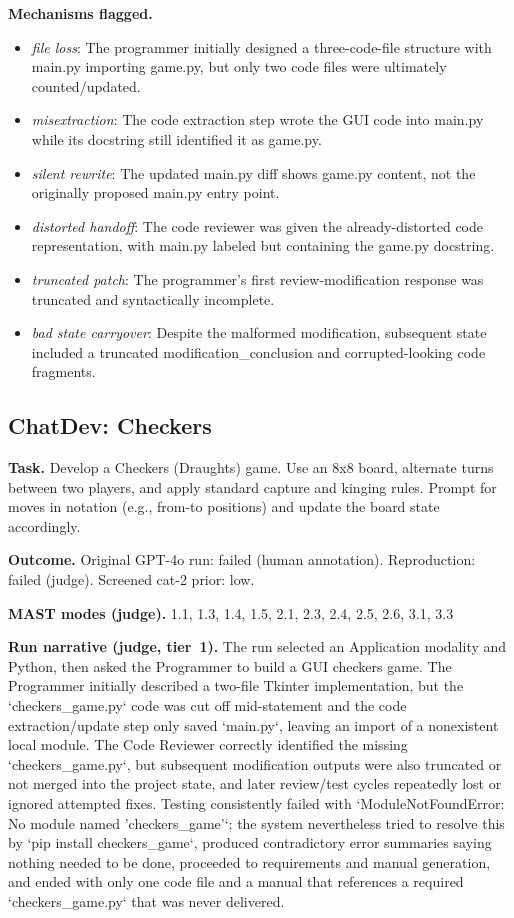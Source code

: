 \textbf{Mechanisms flagged.}
\begin{itemize}
  \item \emph{file loss}: The programmer initially designed a three-code-file structure with main.py importing game.py, but only two code files were ultimately counted/updated.
  \item \emph{misextraction}: The code extraction step wrote the GUI code into main.py while its docstring still identified it as game.py.
  \item \emph{silent rewrite}: The updated main.py diff shows game.py content, not the originally proposed main.py entry point.
  \item \emph{distorted handoff}: The code reviewer was given the already-distorted code representation, with main.py labeled but containing the game.py docstring.
  \item \emph{truncated patch}: The programmer's first review-modification response was truncated and syntactically incomplete.
  \item \emph{bad state carryover}: Despite the malformed modification, subsequent state included a truncated modification\_conclusion and corrupted-looking code fragments.
\end{itemize}

\subsection*{ChatDev: Checkers}
\textbf{Task.} Develop a Checkers (Draughts) game. Use an 8x8 board, alternate turns between two players, and apply standard capture and kinging rules. Prompt for moves in notation (e.g., from-to positions) and update the board state accordingly.

\textbf{Outcome.} Original GPT-4o run: failed (human annotation). Reproduction: failed (judge). Screened cat-2 prior: low.

\textbf{MAST modes (judge).} 1.1, 1.3, 1.4, 1.5, 2.1, 2.3, 2.4, 2.5, 2.6, 3.1, 3.3

\textbf{Run narrative (judge, tier~1).} The run selected an Application modality and Python, then asked the Programmer to build a GUI checkers game. The Programmer initially described a two-file Tkinter implementation, but the `checkers\_game.py` code was cut off mid-statement and the code extraction/update step only saved `main.py`, leaving an import of a nonexistent local module. The Code Reviewer correctly identified the missing `checkers\_game.py`, but subsequent modification outputs were also truncated or not merged into the project state, and later review/test cycles repeatedly lost or ignored attempted fixes. Testing consistently failed with `ModuleNotFoundError: No module named 'checkers\_game'`; the system nevertheless tried to resolve this by `pip install checkers\_game`, produced contradictory error summaries saying nothing needed to be done, proceeded to requirements and manual generation, and ended with only one code file and a manual that references a required `checkers\_game.py` that was never delivered.

